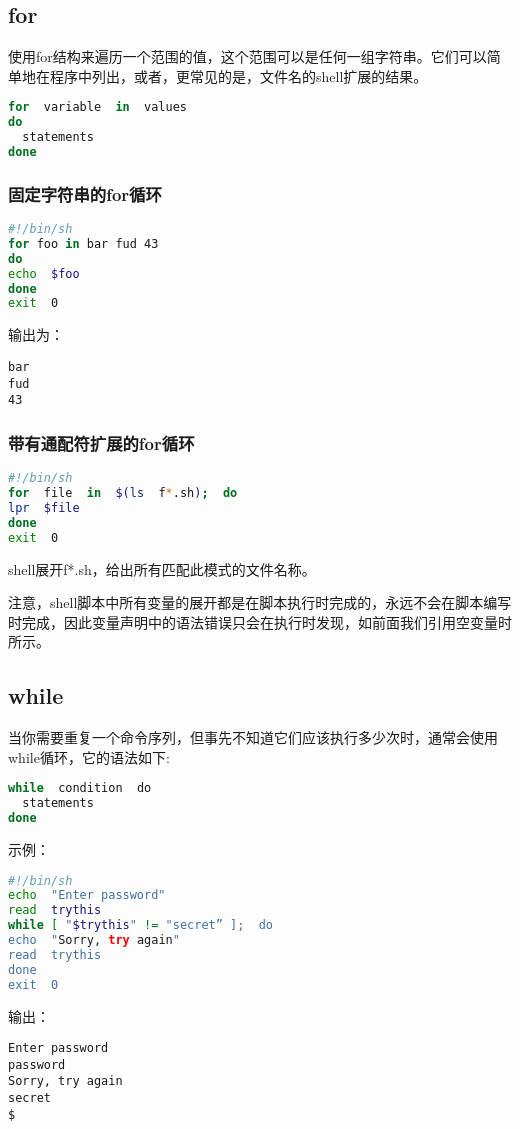 \documentclass[a4paper]{ctexart}
\begin{document}
\subsection{for}
使用for结构来遍历一个范围的值，这个范围可以是任何一组字符串。它们可以简单地在程序中列出，或者，更常见的是，文件名的shell扩展的结果。 
\begin{lstlisting}[language=sh]
for  variable  in  values
do
  statements
done
\end{lstlisting}

\subsubsection{固定字符串的for循环}
\begin{lstlisting}[language=sh]
#!/bin/sh
for foo in bar fud 43
do
echo  $foo
done
exit  0
\end{lstlisting}
输出为：
\begin{lstlisting}
bar
fud
43
\end{lstlisting}

\subsubsection{带有通配符扩展的for循环}
\begin{lstlisting}[language=sh]
#!/bin/sh
for  file  in  $(ls  f*.sh);  do
lpr  $file
done
exit  0
\end{lstlisting}
shell展开f*.sh，给出所有匹配此模式的文件名称。 

注意，shell脚本中所有变量的展开都是在脚本执行时完成的，永远不会在脚本编写时完成，因此变量声明中的语法错误只会在执行时发现，如前面我们引用空变量时所示。

\subsection{while}
当你需要重复一个命令序列，但事先不知道它们应该执行多少次时，通常会使用while循环，它的语法如下:
\begin{lstlisting}[language=sh]
while  condition  do
  statements
done
\end{lstlisting}
示例：
\begin{lstlisting}[language=sh]
#!/bin/sh
echo  "Enter password"
read  trythis
while [ "$trythis" != "secret” ];  do
echo  "Sorry, try again"
read  trythis
done
exit  0
\end{lstlisting}
输出：
\begin{lstlisting}
Enter password
password
Sorry, try again
secret
$
\end{lstlisting}
\end{document}

